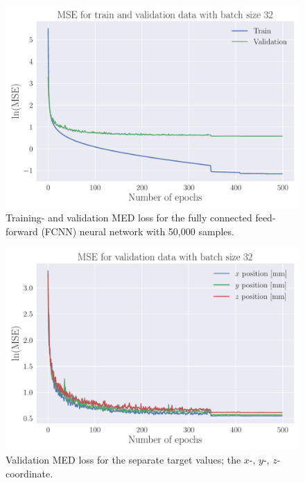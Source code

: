 \documentclass[a4paper, UKenglish, 11pt]{uiomaster}
\begin{document}
\begin{figure}[!htb]
    \centering
    \includegraphics[width=\linewidth]{figures/mse_simple_32_0.001_0.35_0.5_0.0_500_(0).pdf}
    \caption{Training- and validation MED loss for the fully connected feed-forward (FCNN) neural network with 50,000 samples.}
    \label{fig:single_dipole_accuracy}
\end{figure}

\begin{figure}[!htb]
    \centering
    \includegraphics[width=\linewidth]{figures/mse_targets_simple_32_0.001_0.35_0.5_0.0_500_(0).pdf}
    \caption{Validation MED loss for the separate target values; the $x$-, $y$-, $z$-coordinate.}
    \label{fig:single_dipole_accuracy_targets}
\end{figure}
\end{document}
